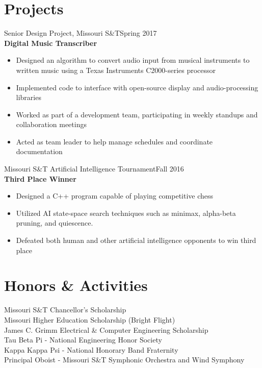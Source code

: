 \documentclass[resmargin]{res}
\begin{document}
\begin{resume}
\newpage

\section{Projects}
Senior Design Project, Missouri S\&T\hfill Spring 2017\\
{\bf Digital Music Transcriber}
\begin{itemize}
	\item Designed an algorithm to convert audio input from musical instruments to written music using a Texas Instruments C2000-series processor
	\item Implemented code to interface with open-source display and audio-processing libraries
	\item Worked as part of a development team, participating in weekly standups and collaboration meetings
	\item Acted as team leader to help manage schedules and coordinate documentation
\end{itemize}

Missouri S\&T Artificial Intelligence Tournament\hfill Fall 2016\\
{\bf Third Place Winner}
\begin{itemize}
	\item Designed a C++ program capable of playing competitive chess
	\item Utilized AI state-space search techniques such as minimax, alpha-beta pruning, and quiescence.
	\item Defeated both human and other artificial intelligence opponents to win third place
\end{itemize}

\section{Honors \& Activities}
Missouri S\&T Chancellor's Scholarship\\
Missouri Higher Education Scholarship (Bright Flight)\\
James C. Grimm Electrical \& Computer Engineering Scholarship\\
Tau Beta Pi - National Engineering Honor Society\\
Kappa Kappa Psi - National Honorary Band Fraternity\\
Principal Oboist - Missouri S\&T Symphonic Orchestra and Wind Symphony

\end{resume}
\end{document}
